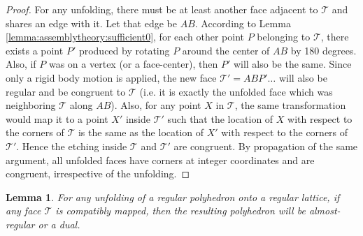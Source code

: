 \documentclass[11pt]{article}
\newtheorem{lemma}[thm]{Lemma}
\newcommand{\1}{\mathds{1}}
\begin{document}
\begin{proof}
 For any unfolding, there must be at least another face adjacent to $\mathcal{T}$ and shares an edge with it. Let that edge be $AB$. According to Lemma \ref{lemma:assemblytheory:sufficient0}, for each other point $P$ belonging to $\mathcal{T}$, there exists a point $P'$ produced by rotating $P$ around the center of $AB$ by 180 degrees. Also, if $P$ was on a vertex (or a face-center), then $P'$ will also be the same. Since only a rigid body motion is applied, the new face $\mathcal{T}' = ABP'\ldots$ will also be regular and be congruent to $\mathcal{T}$ (i.e. it is exactly the unfolded face which was neighboring $\mathcal{T}$ along $AB$). Also, for any point $X$ in $\mathcal{T}$, the same transformation would map it to a point $X'$ inside $\mathcal{T}'$ such that the location of $X$ with respect to the corners of $\mathcal{T}$ is the same as the location of $X'$ with respect to the corners of $\mathcal{T}'$. Hence the etching inside $\mathcal{T}$ and $\mathcal{T}'$ are congruent. By propagation of the same argument, all unfolded faces have corners at integer coordinates and are congruent, irrespective of the unfolding.
\end{proof}


\begin{lemma}
\label{lemma:assemblytheory:sufficient3}
 For any unfolding of a regular polyhedron onto a regular lattice, if any face $\mathcal{T}$ is compatibly mapped, then the resulting polyhedron will be \emph{almost-regular} or a dual.
\end{lemma}
\end{document}
